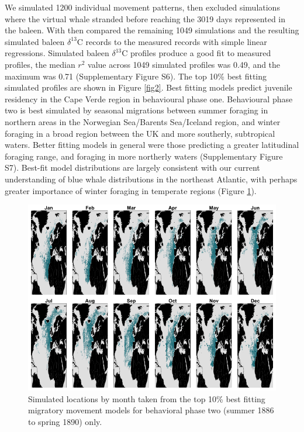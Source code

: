 \documentclass[a4paper,12pt]{article}
\begin{document}
We simulated 1200 individual movement patterns, then excluded simulations where the virtual whale stranded before reaching the 3019 days represented in the baleen.
With then compared the remaining 1049 simulations and the resulting simulated baleen $\delta^{13}$C records to the measured records with simple linear regressions. 
Simulated baleen $\delta^{13}$C profiles produce a good fit to measured profiles, the median $r^2$ value across 1049 simulated profiles was 0.49, and the maximum was 0.71 (Supplementary Figure S6).
The top 10\% best fitting simulated profiles are shown in Figure \ref{fig2}. 
Best fitting models predict juvenile residency in the Cape Verde region in behavioural phase one. 
Behavioural phase two is best simulated by seasonal migrations between summer foraging in northern areas in the Norwegian Sea/Barents Sea/Iceland region, and winter foraging in a broad region between the UK and more southerly, subtropical waters. 
Better fitting models in general were those predicting a greater latitudinal foraging range, and foraging in more northerly waters (Supplementary Figure S7).
Best-fit model distributions are largely consistent with our current understanding of blue whale distributions in the northeast Atlantic\cite{reeves2004historical,baines2014upwellings,baines2017autumn,reeves2004historical}, with perhaps greater importance of winter foraging in temperate regions (Figure \ref{fig4}).

\begin{figure}
 \centering
  \includegraphics[width = \linewidth]{figures/Figure-4-monthly.png}
  \caption{Simulated locations by month taken from the top 10\% best fitting migratory movement models for behavioral phase two (summer 1886 to spring 1890) only.}
  \label{fig4}
\end{figure}
\end{document}
